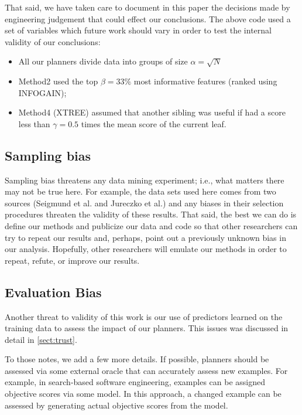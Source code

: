 \documentclass{sig-alternate}
\newcommand{\bi}{\begin{itemize}}
\newcommand{\ei}{\end{itemize}}
\newcommand{\tion}[1]{\textsection\ref{sect:#1}}
\newcommand{\fig}[1]{Figure~\ref{fig:#1}}
\begin{document}
That said, we have taken care to document in this paper the decisions made by engineering
judgement that could effect our conclusions. The above code used a set of variables which future
work should vary in order to test the internal validity of our conclusions:
\bi
\item All our planners divide data into groups of size $\alpha=\sqrt{N}$
\item Method2 used the top $\beta=33\%$ most informative features (ranked using INFOGAIN);
\item Method4 (XTREE) assumed that another sibling was useful if  had 
 a  score less than $\gamma=0.5$ times the mean score of the current leaf.
 \ei

\subsection{  Sampling bias} 
Sampling bias threatens any data mining experiment; i.e., what matters
there may not be true here. For example, the data sets used here comes from two sources
(Seigmund et al. and Jureczko et al.) and any biases in their selection procedures
threaten the validity of these results. 
That said,
the best we can do is define our methods and publicize our data and code so that other researchers can
try to repeat our results and, perhaps, point out a previously unknown bias
in our analysis. Hopefully, other researchers will emulate our methods in
order to repeat, refute, or improve our results. 



\subsection{  Evaluation Bias}\label{sect:coc}
Another threat to validity of this work is our use
of predictors learned on the training data to assess the impact of our planners.
This issues was discussed in detail in \tion{trust}. 

To those notes, we add a few more details. If possible, planners should be assessed via some external oracle that can accurately assess new examples. For example, in search-based software engineering,
examples can be assigned objective scores via  some model. In this approach, a changed example can be assessed by
generating actual objective scores from the model. 



\end{document}

